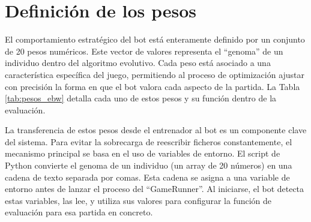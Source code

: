 \section{Definición de los pesos} \label{sec:definicion_pesos}

El comportamiento estratégico del bot está enteramente definido por un conjunto de 20 pesos numéricos. Este vector de valores representa el ``genoma'' de un individuo dentro del algoritmo evolutivo. Cada peso está asociado a una característica específica del juego, permitiendo al proceso de optimización ajustar con precisión la forma en que el bot valora cada aspecto de la partida. La Tabla \ref{tab:pesos_ebw} detalla cada uno de estos pesos y su función dentro de la evaluación.

La transferencia de estos pesos desde el entrenador al bot es un componente clave del sistema. Para evitar la sobrecarga de reescribir ficheros constantemente, el mecanismo principal se basa en el uso de variables de entorno. El script de Python convierte el genoma de un individuo (un array de 20 números) en una cadena de texto separada por comas. Esta cadena se asigna a una variable de entorno antes de lanzar el proceso del ``GameRunner''. Al iniciarse, el bot detecta estas variables, las lee, y utiliza sus valores para configurar la función de evaluación para esa partida en concreto.

